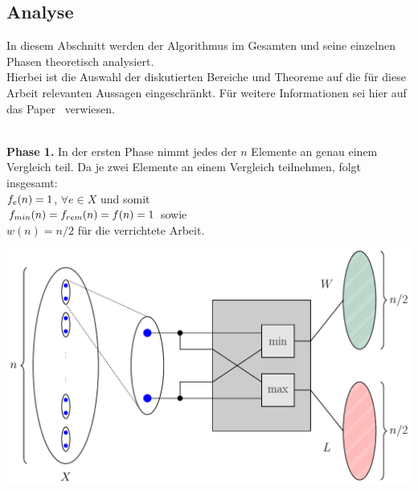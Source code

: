 \subsection{Analyse}	%


\noindent
In diesem Abschnitt werden der Algorithmus \Rm im Gesamten und seine einzelnen Phasen theoretisch analysiert.\\
Hierbei ist die Auswahl der diskutierten Bereiche und Theoreme auf die für diese Arbeit relevanten Aussagen eingeschränkt. Für weitere Informationen sei hier auf das Paper~\cite{meyer1} verwiesen.\\[.1cm]
\noindent\makebox[\linewidth]{\color{gray}{\hdashrule[0.5ex]{\linewidth}{0.5pt}{1.5mm}}}\\[.05cm]
\noindent
\begin{minipage}[Ht]{.44\textwidth}
\textbf{Phase 1.} In der ersten Phase nimmt jedes der $n$ Elemente an genau einem Vergleich teil. Da je zwei Elemente an einem Vergleich teilnehmen, folgt insgesamt:\\

\noindent
$f_{e}(n) = 1$, $\forall e\in X$ und somit\\[.05cm]
$f_{min}(n) = f_{rem}(n) = f(n) = 1$ sowie\\[.05cm]
$w(n)=n/2$ für die verrichtete Arbeit.\\[.05cm]
\end{minipage}%
%
\hfill
%
\begin{minipage}[Ht]{.54\textwidth}
        \centering
        \includegraphics[scale=0.35]{snippets/tikz/min_p1.pdf}
        \vspace*{-4mm}
        \label{fig: min_p1}
        \vspace*{0.1cm}
\end{minipage}

